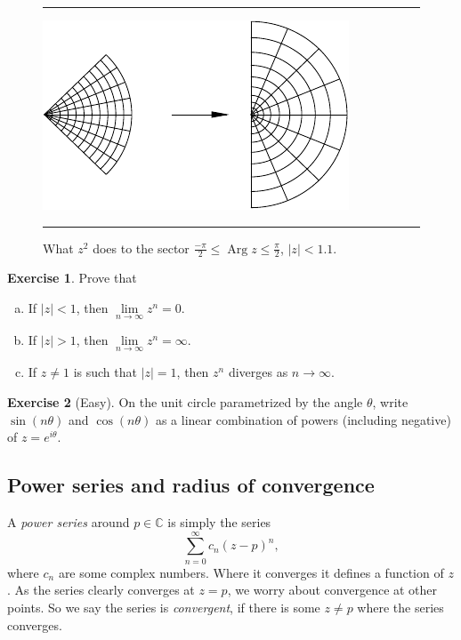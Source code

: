 \documentclass[12pt,openany]{book}
\newcommand{\sabs}[1]{\lvert {#1} \rvert}
\newcommand{\C}{{\mathbb{C}}}
\newcommand{\myindex}[1]{#1\index{#1}}
\theoremstyle{plain}
\theoremstyle{remark}
\theoremstyle{definition}
\newenvironment{exbox}{%
    \def\FrameCommand{\vrule width 1pt \relax\hspace{10pt}}%
    \MakeFramed{\advance\hsize-\width\FrameRestore}%
}{%
    \endMakeFramed
}
\newenvironment{exparts}{%
    \leavevmode\begin{enumerate}[a),noitemsep,topsep=0pt,parsep=0pt,partopsep=0pt]
}{%
    \end{enumerate}
}
\newenvironment{myfig}{%
\begin{figure}[h!t]
\noindent\rule{\textwidth}{0.4pt}\vspace{12pt}\par\centering}%
{\par\noindent\rule{\textwidth}{0.4pt}
\end{figure}}
\theoremstyle{exercise}
\newtheorem{exercise}{Exercise}[section]
\theoremstyle{example}
\begin{document}
\begin{myfig}
\includegraphics{figures/zsqplot}
\caption{What $z^2$ does to the sector
$\frac{-\pi}{2} \leq \operatorname{Arg} z \leq \frac{\pi}{2}$, $\sabs{z} <
1.1$.\label{fig:zsqplot}}
\end{myfig}

\begin{exbox}
\begin{exercise}
Prove that
\begin{exparts}
\item
If $\sabs{z}<1$, then $\lim\limits_{n\to \infty} z^n = 0$.
\item
If $\sabs{z}>1$, then $\lim\limits_{n\to \infty} z^n = \infty$.
\item
If $z \not= 1$ is such that $\sabs{z}=1$, then $z^n$ diverges as $n \to
\infty$.
\end{exparts}
\end{exercise}

\begin{exercise}[Easy]
On the unit circle parametrized by the angle $\theta$,
write $\sin(n\theta)$ and $\cos(n\theta)$ as a linear combination
of powers (including negative) of $z = e^{i\theta}$.
\end{exercise}
\end{exbox}

\subsection{Power series and radius of convergence}

A \emph{\myindex{power series}} around $p \in \C$ is simply the series
\begin{equation*}
\sum_{n=0}^\infty c_n {(z-p)}^n ,
\end{equation*}
where $c_n$ are some complex numbers.  Where it converges it defines a
function of $z$.  As the series clearly converges at $z=p$, we worry about
convergence at other points.  So we say the series is
\emph{convergent}, if there is
some $z \not= p$ where the series converges.
\end{document}
